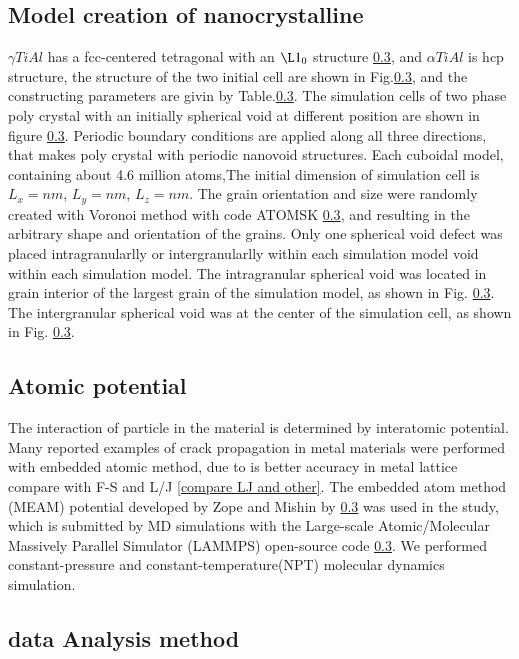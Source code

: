 \documentclass[final,5p,times,twocolumn]{elsarticle}
\begin{document}
\subsection{Model creation of nanocrystalline}
$\gamma  TiAl$ has a fcc-centered tetragonal with an $\L1_0$ structure \ref{}, and $\alpha TiAl$ is hcp structure, the structure of the two initial cell are shown in Fig.\ref{}, and the constructing parameters are givin by Table.\ref{}. The simulation cells of two phase poly crystal with an initially spherical void at different position are shown in figure \ref{}. Periodic boundary conditions are applied along all three directions, that makes poly crystal with periodic nanovoid structures. Each cuboidal model, containing about 4.6 million atoms,The initial dimension of simulation cell is  $L_x = nm$, $L_y =  nm$, $L_z =  nm$. The grain orientation and size were randomly created with Voronoi method with code ATOMSK \ref{}, and resulting in the arbitrary shape and orientation of the grains. Only one spherical void defect was placed intragranularlly or intergranularlly within each simulation model void within each simulation model. The intragranular spherical void was located in grain interior of the largest grain of the simulation model, as shown in Fig. \ref{}. The intergranular spherical void was at the center of the simulation cell, as shown in Fig. \ref{}.

\subsection{Atomic potential}
The interaction of particle in the material is determined by interatomic potential. Many reported examples of crack propagation in metal materials were performed with embedded atomic method, due to is better accuracy in metal lattice compare with F-S and L/J \ref{compare LJ and other}. The embedded atom method (MEAM) potential developed by Zope and Mishin by \ref{} was used in the study, which is submitted by MD simulations with the Large-scale Atomic/Molecular Massively Parallel Simulator (LAMMPS) open-source code \ref{}. We performed constant-pressure and constant-temperature(NPT) molecular dynamics simulation.

\subsection{data Analysis method}
\end{document}
